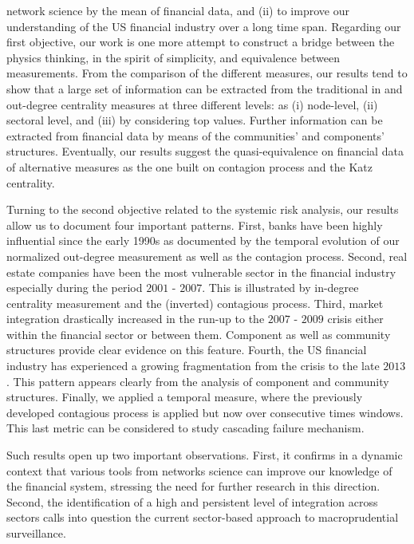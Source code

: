 \documentclass[a4paper,10pt]{article}
\begin{document}
network science by the mean of financial data, and (ii) to improve our understanding of the US financial industry over a long 
time span. Regarding our first objective, our work is one more attempt to construct a bridge between the physics thinking, in
the spirit of simplicity, and equivalence between measurements. From the comparison of the different measures, our results 
tend to show that a large set of information can be extracted from the traditional in and out-degree centrality measures at 
three different levels: as (i) node-level, (ii) sectoral level, and (iii) by considering top values. Further information can
be extracted from financial data by means of the communities’ and components’ structures. Eventually, our results suggest 
the quasi-equivalence on financial data of alternative measures as the one built on contagion process and the Katz centrality.

Turning to the second objective related to the systemic risk analysis, our results allow us to document four important 
patterns. First, banks have been highly influential since the early 1990s as documented by the temporal evolution of our 
normalized out-degree measurement as well as the contagion process. Second, real estate companies have been the most 
vulnerable sector in the financial industry especially during the period $2001$ - $2007$. This is illustrated by in-degree 
centrality measurement and the (inverted) contagious process. Third, market integration drastically increased in the run-up to
the $2007$ - $2009$ crisis either within the financial sector or between them. Component as well as community structures provide
clear evidence on this feature. Fourth, the US financial industry has experienced a growing fragmentation from the crisis to
the late $2013$. This pattern appears clearly from the analysis of component and community structures.  Finally, we applied a temporal measure, where the previously developed contagious process is applied but now over consecutive
times windows. This last metric can be considered to study cascading failure mechanism. 

Such results open up two important observations. First, it confirms in a dynamic context that various tools from networks 
science can improve our knowledge of the financial system, stressing the need for further research in this direction. Second,
the identification of a high and persistent level of integration across sectors calls into question the current sector-based 
approach to macroprudential surveillance.
\end{document}
